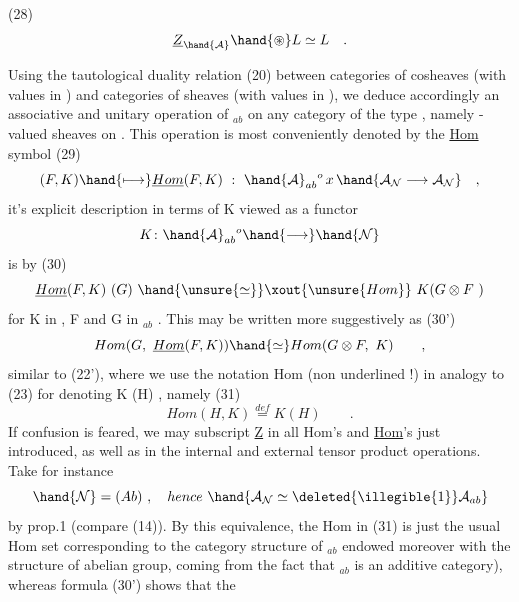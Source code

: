 
(28) \[ \underline{Z}_{\hand{\mathcal{A}}} \hand{\circledast} L \simeq L \quad . \]

Using the tautological duality relation (20) between categories of
cosheaves (with values in ) and categories of sheaves (with values in
), we deduce accordingly an associative and unitary operation
of $_{ab}$ on any category of the type , namely -valued sheaves on .
This operation is most conveniently denoted by the \uline{Hom} symbol
(29) \[ (F, K) \hand{\longmapsto} \underline{Hom}(F,K) \ : \ \hand{\mathcal{A}}_{ab}{}^{o} \, x \, \hand{\mathcal{A}_{\mathcal{N}} \longrightarrow \mathcal{A}_{\mathcal{N}}} \quad , \]
it's explicit description in terms of K\hand{,} viewed as a functor
\[ K\colon \hand{\mathcal{A}}_{ab}{}^{o} \hand{\longrightarrow} \hand{\mathcal{N}} \]
is by
(30) \[ \underline{Hom}(F,K)\ (G) \ \hand{\unsure{\simeq}}\xout{\unsure{Hom}} \ K(G \otimes F\ ) \]
for K in , F and G in $_{ab}$ . This may be written more suggestively as
(30') \[ Hom(G,\ \underline{Hom}(F,K)) \hand{\simeq} Hom(G\otimes F,\ K) \qquad , \]
similar to (22'), where we use the notation Hom (non underlined !) in
analogy to (23) for denoting K (H) , namely
(31) \[ Hom(H,K) \overset{def}{=} K(H) \qquad . \]
If confusion is feared, we may  subscript \uline{Z} in all Hom's and
\uline{Hom}'s just introduced, as well as in the internal and external tensor
product operations. \hand{$\otimes$, $*$, $\circledast$}
\hand{(}Take for instance
\[ \hand{\mathcal{N}} = (Ab) \ , \quad hence \ \hand{\mathcal{A}_{\mathcal{N}} \simeq \deleted{\illegible{1}} \mathcal{A}_{ab}} \]
by prop.1 (compare (14)). By this equivalence, the Hom in (31) is\hand{,} just
the usual Hom set corresponding to the category structure of $_{ab}$  endowed
moreover with the structure of abelian group, coming from the fact that
$_{ab}$ is an additive category), whereas formula (30') shows that the
